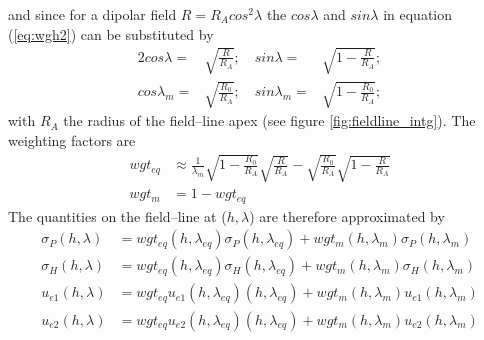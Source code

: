 %
and since for a dipolar field $R = R_A cos^2 \lambda$ the $cos \lambda$ and 
$sin \lambda$ in equation (\ref{eq:wgh2}) can be substituted by 
%
\begin{alignat}{2}
   cos \lambda =& \sqrt{\frac{R}{R_A}};   \quad
   sin \lambda =& \sqrt{1-\frac{R}{R_A}};  \\
   cos \lambda_m =& \sqrt{\frac{R_0}{R_A}};   \quad
   sin \lambda_m =& \sqrt{1-\frac{R_0}{R_A}}; 
\end{alignat}
%
with $R_A$ the radius of the field--line apex (see figure \ref{fig:fieldline_intg}). 
The weighting factors are 
%
\begin{align}
 wgt_{eq} &\approx \frac{1}{\lambda_m} \sqrt{1-\frac{R_0}{R_A}}\sqrt{\frac{R}{R_A}}
     - \sqrt{\frac{R_0}{R_A}}\sqrt{1-\frac{R}{R_A}} \\
 wgt_{m}  &= 1- wgt_{eq}
\end{align}
%
The quantities on the
field--line  at ($h,\lambda$) are therefore approximated by
%
\begin{align}
 \sigma_{P}(h,\lambda) &= wgt_{eq}(h,\lambda_{eq})\sigma_{P}(h,\lambda_{eq})  + 
          wgt_m(h,\lambda_m) \sigma_{P}(h,\lambda_m) \label{eq:approx_sig1} \\
 \sigma_{H}(h,\lambda) &= wgt_{eq}(h,\lambda_{eq})\sigma_{H}(h,\lambda_{eq})  + 
            wgt_m(h,\lambda_m) \sigma_{H}(h,\lambda_m) \label{eq:approx_sig2}\\
 {u}_{e1}(h,\lambda) &= wgt_{eq}{u}_{e1}(h,\lambda_{eq})(h,\lambda_{eq})  + 
          wgt_m(h,\lambda_m) {u}_{e1}(h,\lambda_m) \label{eq:approx_ue1} \\
 {u}_{e2}(h,\lambda) &= wgt_{eq}{u}_{e2}(h,\lambda_{eq})(h,\lambda_{eq})  + 
            wgt_m(h,\lambda_m) {u}_{e2}(h,\lambda_m) \label{eq:approx_ue2}
\end{align}
%
